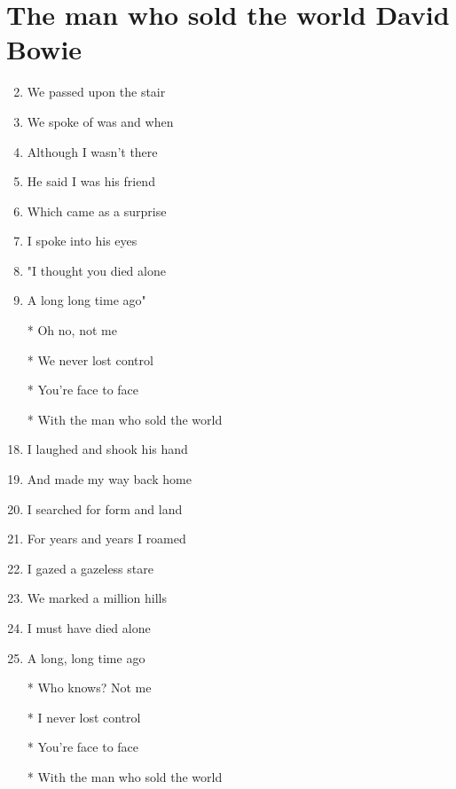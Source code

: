 \documentclass{article}
\begin{document}
    
    \section*{The man who sold the world \by David Bowie}

    \begin{center}
        \begin{enumerate}

            \item[] 
            \item We passed upon the stair
            \item We spoke of was and when
            \item Although I wasn't there
            \item He said I was his friend
            \item Which came as a surprise
            \item I spoke into his eyes
            \item "I thought you died alone
            \item A long long time ago"
            
            \item[]

            \item[] \chorus
            \item[*] Oh no, not me
            \item[*] We never lost control
            \item[*] You're face to face
            \item[*] With the man who sold the world
            
            \item[]

            \item[] 
            \item I laughed and shook his hand
            \item And made my way back home
            \item I searched for form and land
            \item For years and years I roamed
            \item I gazed a gazeless stare
            \item We marked a million hills
            \item I must have died alone
            \item A long, long time ago
            
            \item[]

            \item[] 
            \item[*] Who knows? Not me
            \item[*] I never lost control
            \item[*] You're face to face
            \item[*] With the man who sold the world

        \end{enumerate}
    \end{center}
\end{document}
